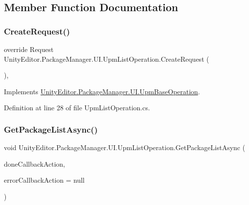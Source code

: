 \subsection{Member Function Documentation}
\mbox{\label{class_unity_editor_1_1_package_manager_1_1_u_i_1_1_upm_list_operation_a6bde4381207e9b9eb75c2d9bb40e412a}} 
\subsubsection{\texorpdfstring{CreateRequest()}{CreateRequest()}}
{\footnotesize\ttfamily override Request Unity\+Editor.\+Package\+Manager.\+U\+I.\+Upm\+List\+Operation.\+Create\+Request (\begin{DoxyParamCaption}{ }\end{DoxyParamCaption})\hspace{0.3cm}{\ttfamily [protected]}, {\ttfamily [virtual]}}



Implements \mbox{\hyperlink{class_unity_editor_1_1_package_manager_1_1_u_i_1_1_upm_base_operation_ae4b93c7bf7b6eb994082e78cb146f793}{Unity\+Editor.\+Package\+Manager.\+U\+I.\+Upm\+Base\+Operation}}.



Definition at line 28 of file Upm\+List\+Operation.\+cs.

\mbox{\label{class_unity_editor_1_1_package_manager_1_1_u_i_1_1_upm_list_operation_a0e8627929664d10a9c5ad1d1a328f375}} 
\subsubsection{\texorpdfstring{GetPackageListAsync()}{GetPackageListAsync()}}
{\footnotesize\ttfamily void Unity\+Editor.\+Package\+Manager.\+U\+I.\+Upm\+List\+Operation.\+Get\+Package\+List\+Async (\begin{DoxyParamCaption}\item[{Action$<$ I\+Enumerable$<$ \mbox{\hyperlink{class_unity_editor_1_1_package_manager_1_1_u_i_1_1_package_info}{Package\+Info}} $>$$>$}]{done\+Callback\+Action,  }\item[{Action$<$ \mbox{\hyperlink{class_unity_editor_1_1_package_manager_1_1_u_i_1_1_upm_base_operation_a116dcc466d587905084e826b47f7e05b}{Error}} $>$}]{error\+Callback\+Action = {\ttfamily null} }\end{DoxyParamCaption})}



